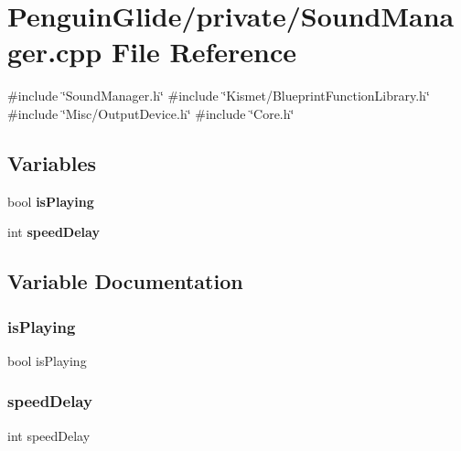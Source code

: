 \section{Penguin\+Glide/private/\+Sound\+Manager.cpp File Reference}
\label{_sound_manager_8cpp}
{\ttfamily \#include \char`\"{}Sound\+Manager.\+h\char`\"{}}\newline
{\ttfamily \#include \char`\"{}Kismet/\+Blueprint\+Function\+Library.\+h\char`\"{}}\newline
{\ttfamily \#include \char`\"{}Misc/\+Output\+Device.\+h\char`\"{}}\newline
{\ttfamily \#include \char`\"{}Core.\+h\char`\"{}}\newline
\subsection*{Variables}
\begin{DoxyCompactItemize}
\item 
bool \textbf{ is\+Playing}
\item 
int \textbf{ speed\+Delay}
\end{DoxyCompactItemize}


\subsection{Variable Documentation}
\mbox{\label{_sound_manager_8cpp_af55f7beec49af3268e5ed9aa85dc8d4f}} 
\subsubsection{isPlaying}
{\footnotesize\ttfamily bool is\+Playing}

\mbox{\label{_sound_manager_8cpp_a04975d519149e28a687a774d1b813827}} 
\subsubsection{speedDelay}
{\footnotesize\ttfamily int speed\+Delay}

